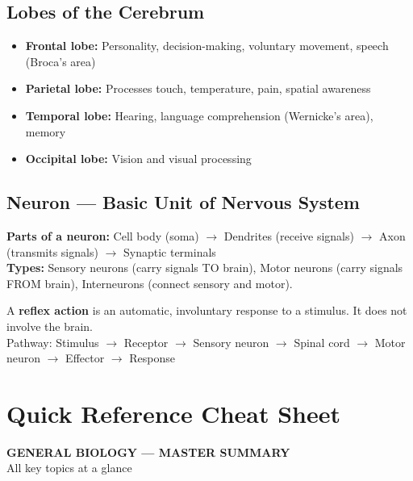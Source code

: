 \documentclass[12pt]{article}
\begin{document}
\subsection{Lobes of the Cerebrum}
\begin{itemize}[leftmargin=16pt, itemsep=3pt]
  \item \textbf{Frontal lobe:} Personality, decision-making, voluntary movement, speech (Broca's area)
  \item \textbf{Parietal lobe:} Processes touch, temperature, pain, spatial awareness
  \item \textbf{Temporal lobe:} Hearing, language comprehension (Wernicke's area), memory
  \item \textbf{Occipital lobe:} Vision and visual processing
\end{itemize}

\subsection{Neuron — Basic Unit of Nervous System}
\begin{keybox}
\textbf{Parts of a neuron:} Cell body (soma) $\to$ Dendrites (receive signals) $\to$ Axon (transmits signals) $\to$ Synaptic terminals\\[4pt]
\textbf{Types:} Sensory neurons (carry signals TO brain), Motor neurons (carry signals FROM brain), Interneurons (connect sensory and motor).
\end{keybox}

\begin{thmbox}
A \textbf{reflex action} is an automatic, involuntary response to a stimulus. It does not involve the brain.\\
Pathway: Stimulus $\to$ Receptor $\to$ Sensory neuron $\to$ Spinal cord $\to$ Motor neuron $\to$ Effector $\to$ Response
\end{thmbox}

\section{Quick Reference Cheat Sheet}

\begin{tcolorbox}[enhanced, arc=0pt, boxrule=0pt,
  colback=primary, colframe=primary,
  left=14pt, right=14pt, top=10pt, bottom=10pt,
  borderline south={3pt}{0pt}{accent}]
  \centering
  {\large\bfseries\color{white} GENERAL BIOLOGY — MASTER SUMMARY}\\[4pt]
  {\small\color{lightbg} All key topics at a glance}
\end{tcolorbox}
\end{document}
